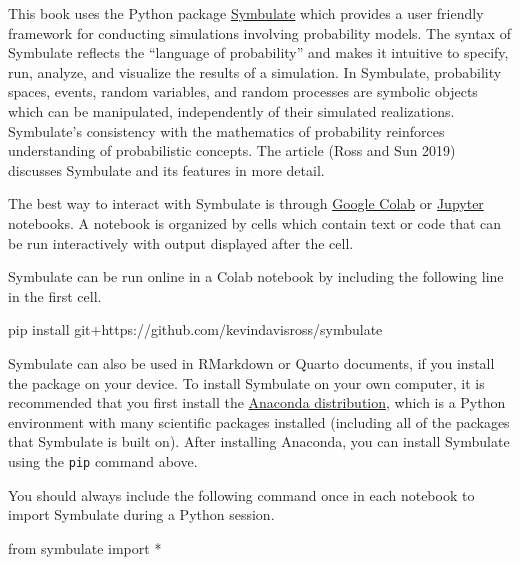 \documentclass[
  letterpaper,
  DIV=11,
  numbers=noendperiod]{scrreprt}
\newenvironment{Shaded}{\begin{snugshade}}{\end{snugshade}}
\newcommand{\ImportTok}[1]{\textcolor[rgb]{0.00,0.46,0.62}{#1}}
\newcommand{\NormalTok}[1]{\textcolor[rgb]{0.00,0.23,0.31}{#1}}
\newcommand{\OperatorTok}[1]{\textcolor[rgb]{0.37,0.37,0.37}{#1}}
\theoremstyle{plain}
\theoremstyle{definition}
\theoremstyle{definition}
\theoremstyle{definition}
\theoremstyle{remark}
\begin{document}

This book uses the Python package
\href{https://github.com/dlsun/symbulate}{Symbulate} which provides a
user friendly framework for conducting simulations involving probability
models. The syntax of Symbulate reflects the ``language of probability''
and makes it intuitive to specify, run, analyze, and visualize the
results of a simulation. In Symbulate, probability spaces, events,
random variables, and random processes are symbolic objects which can be
manipulated, independently of their simulated realizations. Symbulate's
consistency with the mathematics of probability reinforces understanding
of probabilistic concepts. The article (Ross and Sun 2019) discusses
Symbulate and its features in more detail.

The best way to interact with Symbulate is through
\href{https://colab.research.google.com/}{Google Colab} or
\href{https://jupyter.org/}{Jupyter} notebooks. A notebook is organized
by cells which contain text or code that can be run interactively with
output displayed after the cell.

Symbulate can be run online in a Colab notebook by including the
following line in the first cell.

\begin{Shaded}
\begin{Highlighting}[]
\NormalTok{pip install git}\OperatorTok{+}\NormalTok{https:}\OperatorTok{//}\NormalTok{github.com}\OperatorTok{/}\NormalTok{kevindavisross}\OperatorTok{/}\NormalTok{symbulate}
\end{Highlighting}
\end{Shaded}

Symbulate can also be used in RMarkdown or Quarto documents, if you
install the package on your device. To install Symbulate on your own
computer, it is recommended that you first install the
\href{https://www.anaconda.com/distribution/}{Anaconda distribution},
which is a Python environment with many scientific packages installed
(including all of the packages that Symbulate is built on). After
installing Anaconda, you can install Symbulate using the \texttt{pip}
command above.

You should always include the following command once in each notebook to
import Symbulate during a Python session.

\begin{Shaded}
\begin{Highlighting}[]
\ImportTok{from}\NormalTok{ symbulate }\ImportTok{import} \OperatorTok{*}
\end{Highlighting}
\end{Shaded}
\end{document}
